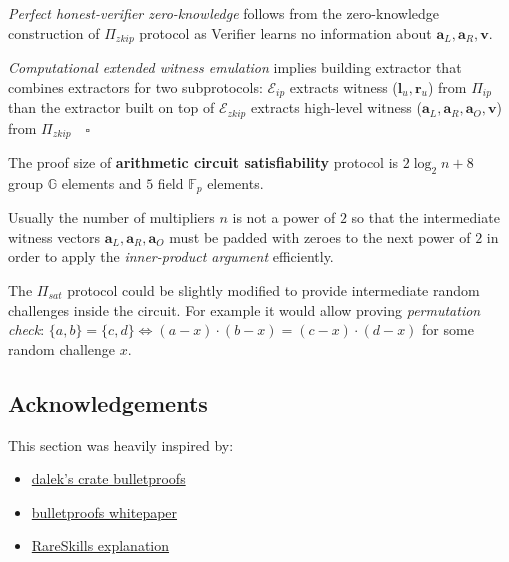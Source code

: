 \documentclass[../lecture-notes-148x210.tex]{subfiles}
\begin{document}
\textit{Perfect honest-verifier zero-knowledge} follows from the zero-knowledge construction of $\Pi_{zkip}$ protocol as Verifier learns no information about $\mathbf{a}_L, \mathbf{a}_R, \mathbf{v}$.

\textit{Computational extended witness emulation} implies building extractor that combines extractors for two subprotocols: $\mathcal{E}_{ip}$ extracts witness ($\mathbf{l}_u, \mathbf{r}_u$) from $\Pi_{ip}$ than the extractor built on top of $\mathcal{E}_{zkip}$ extracts high-level witness ($\mathbf{a}_L, \mathbf{a}_R, \mathbf{a}_O, \mathbf{v}$) from $\Pi_{zkip} \quad \square$

The proof size of \textbf{arithmetic circuit satisfiability} protocol is $2 \log_2n +8$ group $\mathbb{G}$ elements and $5$ field $\mathbb{F}_p$ elements.

Usually the number of multipliers $n$ is not a power of $2$ so that the intermediate witness vectors $\mathbf{a}_L, \mathbf{a}_R, \mathbf{a}_O$ must be padded with zeroes to the next power of $2$ in order to apply the \textit{inner-product argument} efficiently. 
\begin{remark}
    The $\Pi_{sat}$ protocol could be slightly modified to provide intermediate random challenges inside the circuit. For example it would allow proving \textit{permutation check}: $\{a,b\} = \{c,d\}  \iff (a-x)\cdot(b-x) = (c-x)\cdot(d-x)$ for some random challenge $x$.
\end{remark}
\subsection*{Acknowledgements}
This section was heavily inspired by:
\begin{itemize}
    \item \href{https://doc-internal.dalek.rs/bulletproofs/index.html}{dalek's crate bulletproofs}
    \item \href{https://eprint.iacr.org/2017/1066.pdf}{bulletproofs whitepaper}
    \item \href{https://rareskills.io/post/zk-multiplication}{RareSkills explanation}
\end{itemize}
\end{document}
